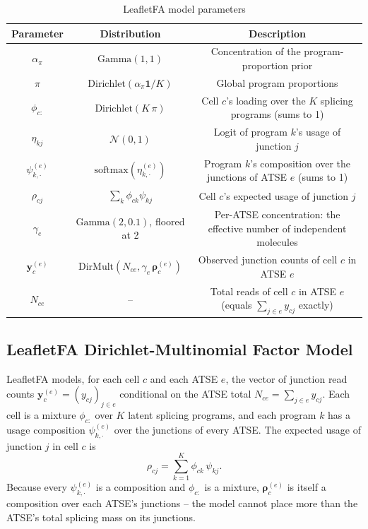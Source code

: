 \begin{table}[h]
\centering
\scriptsize
\captionsetup{font=small}
\begin{tabular}{|c|c|c|}
\hline
\textbf{Parameter} & \textbf{Distribution} & \textbf{Description} \\
\hline
$\alpha_\pi$ & $\text{Gamma}(1, 1)$ & Concentration of the program-proportion prior \\
$\pi$ & $\text{Dirichlet}(\alpha_\pi\mathbf{1}/K)$ & Global program proportions \\
$\phi_{c:}$ & $\text{Dirichlet}(K\,\pi)$ & Cell $c$'s loading over the $K$ splicing programs (sums to 1) \\
$\eta_{kj}$ & $\mathcal{N}(0,1)$ & Logit of program $k$'s usage of junction $j$ \\
$\psi_{k,\cdot}^{(e)}$ & $\text{softmax}(\eta_{k,\cdot}^{(e)})$ & Program $k$'s composition over the junctions of ATSE $e$ (sums to 1) \\
$\rho_{cj}$ & $\sum_k \phi_{ck}\psi_{kj}$ & Cell $c$'s expected usage of junction $j$ \\
$\gamma_e$ & $\text{Gamma}(2, 0.1)$, floored at 2 & Per-ATSE concentration: the effective number of independent molecules \\
$\mathbf{y}_{c}^{(e)}$ & $\text{DirMult}(N_{ce}, \gamma_e\,\boldsymbol{\rho}_{c}^{(e)})$ & Observed junction counts of cell $c$ in ATSE $e$ \\
$N_{ce}$ & -- & Total reads of cell $c$ in ATSE $e$ (equals $\sum_{j\in e} y_{cj}$ exactly) \\
\hline
\end{tabular}
\caption{LeafletFA model parameters}
\label{tab:model_parameters}
\end{table}
\vspace{0.6cm}

\subsection*{LeafletFA Dirichlet-Multinomial Factor Model}\label{sec:LeafletFAMethod}

LeafletFA models, for each cell $c$ and each ATSE $e$, the vector of junction read counts $\mathbf{y}_c^{(e)} = (y_{cj})_{j \in e}$ conditional on the ATSE total $N_{ce} = \sum_{j\in e} y_{cj}$. Each cell is a mixture $\phi_{c:}$ over $K$ latent splicing programs, and each program $k$ has a usage composition $\psi_{k,\cdot}^{(e)}$ over the junctions of every ATSE. The expected usage of junction $j$ in cell $c$ is
$$\rho_{cj} = \sum_{k=1}^K \phi_{ck}\,\psi_{kj}.$$
Because every $\psi_{k,\cdot}^{(e)}$ is a composition and $\phi_{c:}$ is a mixture, $\boldsymbol{\rho}_c^{(e)}$ is itself a composition over each ATSE's junctions -- the model cannot place more than the ATSE's total splicing mass on its junctions.

